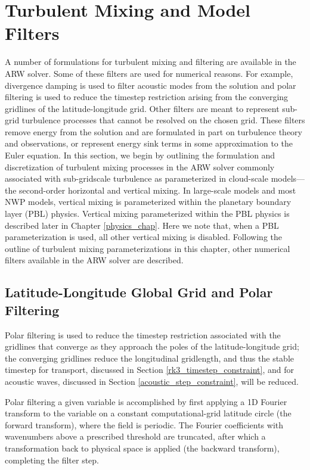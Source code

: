 \chapter{Turbulent Mixing and Model Filters}
\label{filter_chap}

A number of formulations for turbulent mixing and filtering are
available in the ARW solver.  Some of these filters are used for
numerical reasons.  For example, divergence damping is used to filter
acoustic modes from the solution and polar filtering is used to reduce 
the timestep restriction arising from the converging gridlines of the 
latitude-longitude grid.  Other filters are meant to represent
sub-grid turbulence processes that cannot be resolved on the chosen
grid.  These filters remove energy from the solution and are formulated
in part on turbulence theory and observations, or represent energy sink
terms in some approximation to the Euler equation.  In this section, we
begin by outlining the formulation and discretization of turbulent
mixing processes in the ARW solver commonly associated with sub-gridscale
turbulence as parameterized in cloud-scale models--- the second-order
horizontal and vertical mixing.  In large-scale models and most NWP
models, vertical mixing is parameterized within the planetary boundary
layer (PBL) physics.  Vertical mixing parameterized within the PBL
physics is described later in Chapter \ref{physics_chap}.  Here we note
that, when a PBL parameterization is used, all other vertical mixing is
disabled.  Following the outline of turbulent mixing parameterizations
in this chapter, other numerical filters available in the ARW solver are
described.


\section{Latitude-Longitude Global Grid and Polar Filtering}
\label{polar_filter_section}

Polar filtering is used to reduce the timestep restriction associated
with the gridlines that converge as they approach the poles of the
latitude-longitude grid; the converging gridlines reduce the
longitudinal gridlength, and thus the stable timestep for transport,
discussed in Section \ref{rk3_timestep_constraint}, and for acoustic
waves, discussed in Section \ref{acoustic_step_constraint}, will be reduced.

Polar filtering a given variable is accomplished by first applying a 1D
Fourier transform to the variable on a constant computational-grid
latitude circle (the forward transform), where the field is periodic.
The Fourier coefficients with wavenumbers above a prescribed threshold
are truncated, after which a transformation back to physical space is
applied (the backward transform), completing the filter step.

